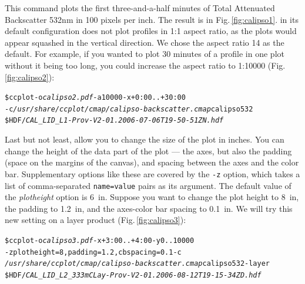 \noindent This command plots the first three-and-a-half minutes of
Total Attenuated Backscatter 532nm in 100 pixels per inch. The result is in
Fig.\,\ref{fig:calipso1}.
\ccplot in its default configuration does not plot profiles in 1:1 aspect ratio,
as the plots would appear squashed in the vertical direction. We chose the
aspect ratio 14 as the default.
For example, if you wanted to plot 30 minutes of a profile in one plot
without it being too long, you could increase the aspect ratio to 1:10000
(Fig.\,\ref{fig:calipso2}):

\begin{alltt}
\$ ccplot -o \textit{calipso2.pdf} -a 10000 -x +0:00..+30:00
-c \textit{/usr/share/ccplot/cmap/calipso-backscatter.cmap} calipso532
\$HDF/\textit{CAL_LID_L1-Prov-V2-01.2006-07-06T19-50-51ZN.hdf}
\end{alltt}

\noindent Last but not least, \ccplot allow you to change the size of the plot
in inches.
You can change the height of the data part of the plot --- the axes, but also the
padding (space on the margins of the canvas), and spacing between the axes and
the color bar. Supplementary options like these are covered by the \texttt{-z}
option, which takes a list of comma-separated \texttt{name=value} pairs as its
argument. The default value of the \textit{plotheight} option is \SI{6}{in}. Suppose you
want to change the plot height to \SI{8}{in}, the padding to \SI{1.2}{in}, and
the axes-color bar spacing to
\SI{0.1}{in}. We will try this new setting on a layer product
(Fig.\,\ref{fig:calipso3}):

\begin{alltt}
\$ ccplot -o \textit{calipso3.pdf} -x +3:00..+4:00 -y 0..10000
-z plotheight=8,padding=1.2,cbspacing=0.1 -c
\textit{/usr/share/ccplot/cmap/calipso-backscatter.cmap} calipso532-layer
\$HDF/\textit{CAL_LID_L2_333mCLay-Prov-V2-01.2006-08-12T19-15-34ZD.hdf}
\end{alltt}


